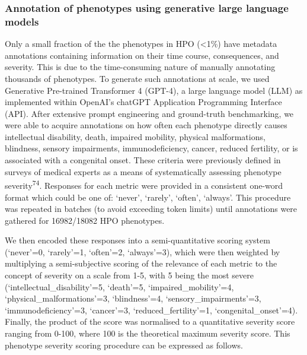 \documentclass[
sn-nature
]{sn-jnl}
\begin{document}
\subsubsection{Annotation of phenotypes using generative large language
models}\label{annotation-of-phenotypes-using-generative-large-language-models-1}

Only a small fraction of the the phenotypes in HPO (\textless1\%) have
metadata annotations containing information on their time course,
consequences, and severity. This is due to the time-consuming nature of
manually annotating thousands of phenotypes. To generate such
annotations at scale, we used Generative Pre-trained Transformer 4
(GPT-4), a large language model (LLM) as implemented within OpenAI's
chatGPT Application Programming Interface (API). After extensive prompt
engineering and ground-truth benchmarking, we were able to acquire
annotations on how often each phenotype directly causes intellectual
disability, death, impaired mobility, physical malformations, blindness,
sensory impairments, immunodeficiency, cancer, reduced fertility, or is
associated with a congenital onset. These criteria were previously
defined in surveys of medical experts as a means of systematically
assessing phenotype severity\textsuperscript{74}. Responses for each
metric were provided in a consistent one-word format which could be one
of: `never', `rarely', `often', `always'. This procedure was repeated in
batches (to avoid exceeding token limits) until annotations were
gathered for 16982/18082 HPO phenotypes.

We then encoded these responses into a semi-quantitative scoring system
(`never'=0, `rarely'=1, `often'=2, `always'=3), which were then weighted
by multiplying a semi-subjective scoring of the relevance of each metric
to the concept of severity on a scale from 1-5, with 5 being the most
severe (`intellectual\_disability'=5, `death'=5, `impaired\_mobility'=4,
`physical\_malformations'=3, `blindness'=4, `sensory\_impairments'=3,
`immunodeficiency'=3, `cancer'=3, `reduced\_fertility'=1,
`congenital\_onset'=4). Finally, the product of the score was normalised
to a quantitative severity score ranging from 0-100, where 100 is the
theoretical maximum severity score. This phenotype severity scoring
procedure can be expressed as follows.

\hfill\break
\hfill\break
\end{document}
